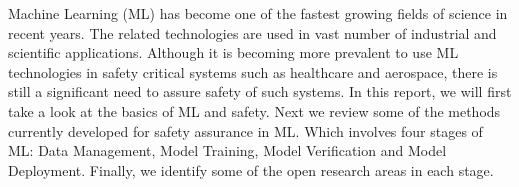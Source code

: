 
Machine Learning (ML) has become one of the fastest growing fields of science in recent years. The related technologies are used in vast number of industrial and scientific applications. Although it is becoming more prevalent to use ML technologies in safety critical systems such as healthcare and aerospace, there is still a significant need to assure safety of such systems. In this report, we will first take a look at the basics of ML and safety. Next we review some of the methods currently developed for safety assurance in ML. Which involves four stages of ML: Data Management, Model Training, Model Verification and Model Deployment. Finally, we identify some of the open research areas in each stage. 
